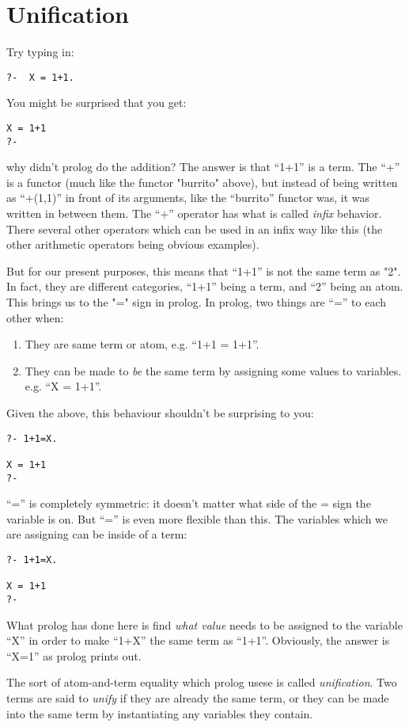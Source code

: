 \documentclass{book}[9pt]
\begin{document}
\section{Unification}

Try typing in:
\begin{verbatim}
?-  X = 1+1.
\end{verbatim}
\noindent You might be surprised that you get:
\begin{verbatim}
X = 1+1
?- 
\end{verbatim}
\noindent why didn't prolog do the addition?  The answer is that
``1+1'' is a term.  The ``+'' is a functor (much like the functor
"burrito" above), but instead of being written as ``+(1,1)'' in front
of its arguments, like the ``burrito'' functor was, it was written in
between them.  The ``+'' operator has what is called {\em infix}
behavior.  There several other operators which can be used in an infix
way like this (the other arithmetic operators being obvious examples).

But for our present purposes, this means that ``1+1'' is not the same
term as "2".  In fact, they are different categories, ``1+1'' being a
term, and ``2'' being an atom.  This brings us to the "=" sign in
prolog.  In prolog, two things are ``='' to each other when:
\begin{enumerate}
\item They are same term or atom, e.g. ``1+1 = 1+1''.
\item They can be made to {\em be} the same term by assigning some
 values to variables. e.g. ``X = 1+1''.
\end{enumerate}
\noindent Given the above, this behaviour shouldn't be surprising to you:
\begin{verbatim}
?- 1+1=X.

X = 1+1
?- 
\end{verbatim}
\noindent ``='' is completely symmetric: it doesn't matter what side
of the = sign the variable is on.  But ``='' is even more flexible
than this.  The variables which we are assigning can be inside of a
term:
\begin{verbatim}
?- 1+1=X.

X = 1+1
?- 
\end{verbatim}
\noindent What prolog has done here is find {\em what value} needs to
be assigned to the variable ``X'' in order to make ``1+X'' the same
term as ``1+1''.  Obviously, the answer is ``X=1'' as prolog prints
out.

The sort of atom-and-term equality which prolog usese is called {\em
unification}.  Two terms are said to {\em unify} if they are already
the same term, or they can be made into the same term by instantiating
any variables they contain.
\end{document}
